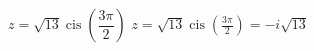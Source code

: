 { $z = \sqrt{13}\operatorname{cis}\left(\dfrac{3\pi}{2}\right)$ }
{ $z = \sqrt{13}\operatorname{cis}\left(\frac{3\pi}{2}\right) = -i\sqrt{13}$ }
